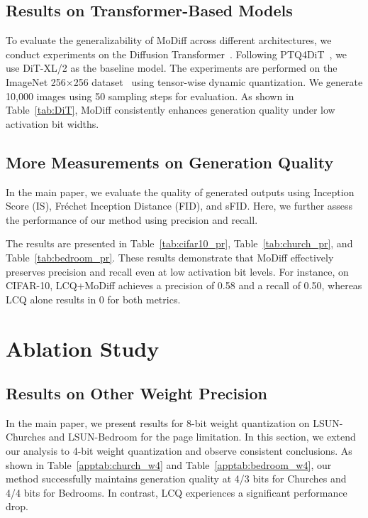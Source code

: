 

\subsection{Results on Transformer-Based Models}
\label{appsec: DiT}
To evaluate the generalizability of MoDiff across different architectures, we conduct experiments on the Diffusion Transformer~\citep{peebles2023scalable}. Following PTQ4DiT~\citep{wu2024ptq4dit}, we use DiT-XL/2 as the baseline model. The experiments are performed on the ImageNet 256×256 dataset~\citep{ILSVRC15} using tensor-wise dynamic quantization. We generate 10,000 images using 50 sampling steps for evaluation. As shown in Table~\ref{tab:DiT}, MoDiff consistently enhances generation quality under low activation bit widths.



\subsection{More Measurements on Generation Quality}
In the main paper, we evaluate the quality of generated outputs using Inception Score (IS), Fréchet Inception Distance (FID), and sFID. Here, we further assess the performance of our method using precision and recall. 

The results are presented in Table~\ref{tab:cifar10_pr}, Table~\ref{tab:church_pr}, and Table~\ref{tab:bedroom_pr}. These results demonstrate that MoDiff effectively preserves precision and recall even at low activation bit levels. For instance, on CIFAR-10, LCQ+MoDiff achieves a precision of 0.58 and a recall of 0.50, whereas LCQ alone results in 0 for both metrics.

\label{appsec:measurements}




\section{Ablation Study}
\label{appsec:ablation}

\subsection{Results on Other Weight Precision}
\label{appsec:otherwp}
In the main paper, we present results for 8-bit weight quantization on LSUN-Churches and LSUN-Bedroom for the page limitation. In this section, we extend our analysis to 4-bit weight quantization and observe consistent conclusions. As shown in Table~\ref{apptab:church_w4} and Table~\ref{apptab:bedroom_w4}, our method successfully maintains generation quality at 4/3 bits for Churches and 4/4 bits for Bedrooms. In contrast, LCQ experiences a significant performance drop.



